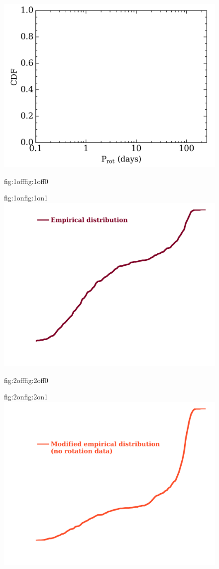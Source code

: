 \begin{figure}
  \centering
  \includegraphics[width=0.8\hsize]{figures/ProtCDF_bkgd.png}%
  \hspace{-0.8\hsize}%
  \begin{ocg}{fig:1off}{fig:1off}{0}%
  \end{ocg}%
  \begin{ocg}{fig:1on}{fig:1on}{1}%
    \includegraphics[width=0.8\hsize]{figures/ProtCDF_1.png}%
  \end{ocg}
  \hspace{-0.8\hsize}%
  \begin{ocg}{fig:2off}{fig:2off}{0}%
  \end{ocg}%
  \begin{ocg}{fig:2on}{fig:2on}{1}%
    \includegraphics[width=0.8\hsize]{figures/ProtCDF_2.png}%

\end{ocg}
\end{figure}
